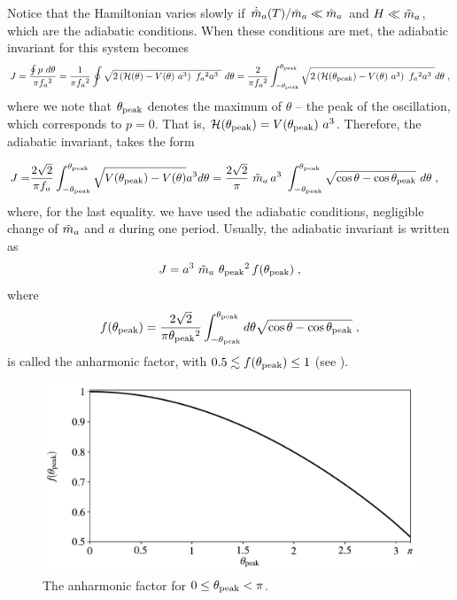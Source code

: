 \documentclass[11pt,a4paper]{article}
\begin{document}
Notice that the Hamiltonian varies slowly if $\dot {\tilde{m}}_{a}(T)/\tilde m_{a}{} \ll \tilde m_{a}{}$ and $H \ll \tilde m_{a}{}$, which are the adiabatic conditions.  When these conditions are met, the adiabatic invariant for this system becomes
%
\begin{equation}
	J = \dfrac{\oint p \ d \theta}{\pi f_{a}{}^2} = \dfrac{1}{\pi f_{a}{}^2} \oint \sqrt{ 2\left(  \mathcal{H}(\theta) - V(\theta) \ a^3 \right) \ f_{a}{}^2 a^3 \ }  \ d \theta  =
	 \dfrac{2}{\pi f_{a}{}^2} \int_{-\theta_{\rm peak}{}}^{\theta_{\rm peak}{}} \sqrt{ 2\left(  \mathcal{H}(\theta_{\rm peak}{}) - V(\theta) \ a^3 \right) \ f_{a}{}^2 a^3 \ } d \theta \;,
	 \label{eq:J_axion_definition}
\end{equation}
%
where we note that $\theta_{\rm peak}{}$ denotes the maximum of $\theta$ -- the peak of the oscillation, which corresponds to $p=0$. That is, $\Ham(\thetamax) = V(\thetamax) \ a^3$. Therefore, the adiabatic invariant, takes the form 

\begin{eqnarray}
	J=&  \dfrac{2 \sqrt{2} }{\pi f_{a}{}}  \int_{- \theta_{\rm peak}{}} ^{\theta_{\rm peak}{}}  \sqrt{ V(\theta_{\rm peak}{}) - V(\theta) } a^{3} d \theta = 
	\dfrac{2 \sqrt{2} }{\pi} \ \tilde m_{a}{} \, a^3 \ \displaystyle \int_{- \theta_{\rm peak}{}}^{\theta_{\rm peak}{}} \sqrt{\cos \theta - \cos \theta_{\rm peak}{}} \ d \theta  
	\;,
	\label{eq:J_axion_derivation}
\end{eqnarray}
%
where, for the last equality. we have used the adiabatic conditions, \ie negligible change of $\tilde m_{a}{}$ and $a$ during one period. Usually, the adiabatic invariant is written as~\cite{Lyth:1991ub,Bae:2008ue} 
%
\begin{equation}
	J = a^3 \ \tilde m_{a}{} \ \theta_{\rm peak}{}^2  \, f(\theta_{\rm peak}{})  \;,
	\label{eq:J_axion_final_form}
\end{equation}
%
where 
\begin{equation}
	f(\theta_{\rm peak}{}) =\dfrac{ 2 \sqrt{2}}{\pi \theta_{\rm peak}{}^2 } \displaystyle \int_{- \theta_{\rm peak}{}}^{\theta_{\rm peak}{}} d \theta \sqrt{ \cos \theta - \cos \theta_{\rm peak}{} } \;,
	\label{eq:anharmonic_f}
\end{equation}
%
is called the anharmonic factor, with $ 0.5 \lesssim f(\theta_{\rm peak}{}) \leq 1$ (see ).


\begin{figure}[t]
	\includegraphics[width=1\textwidth]{figs/anharmonic_factor.pdf}
	\caption{The anharmonic factor for $0 \leq \theta_{\rm peak}{} < \pi $.}
	\label{fig:anharmonic_factor}
\end{figure}
\end{document}
